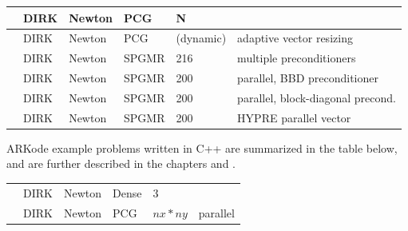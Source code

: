 \documentclass[letterpaper,10pt,english]{sphinxmanual}
\begin{document}
\begin{savenotes}
\begin{tabulary}{\linewidth}[t]{|T|T|T|T|T|T|}
\\
\hline
{\hyperref[\detokenize{c_serial:ark-heat1d}]{}}
&
DIRK
&
Newton
&
PCG
&
N
&\\
\hline
{\hyperref[\detokenize{c_serial:ark-heat1d-adapt}]{}}
&
DIRK
&
Newton
&
PCG
&
(dynamic)
&
adaptive vector resizing
\\
\hline
{\hyperref[\detokenize{c_serial:ark-krylovdemo-prec}]{}}
&
DIRK
&
Newton
&
SPGMR
&
216
&
multiple preconditioners
\\
\hline
{\hyperref[\detokenize{c_parallel:ark-diurnal-kry-bbd-p}]{}}
&
DIRK
&
Newton
&
SPGMR
&
200
&
parallel, BBD preconditioner
\\
\hline
{\hyperref[\detokenize{c_parallel:ark-diurnal-kry-p}]{}}
&
DIRK
&
Newton
&
SPGMR
&
200
&
parallel, block-diagonal precond.
\\
\hline
{\hyperref[\detokenize{c_parhyp:ark-diurnal-kry-ph}]{}}
&
DIRK
&
Newton
&
SPGMR
&
200
&
HYPRE parallel vector
\\
\hline
\end{tabulary}
\par
\sphinxattableend\end{savenotes}

ARKode example problems written in C++ are summarized in the table
below, and are further described in the chapters {\hyperref[\detokenize{cpp_serial:serial-cpp}]{}} and
{\hyperref[\detokenize{cpp_parallel:parallel-cpp}]{}}.


\begin{savenotes}\sphinxattablestart
\centering
\begin{tabulary}{\linewidth}[t]{|T|T|T|T|T|T|}
\hline
{}\relax &\relax &\relax &\relax &\relax &\relax \\
\hline
{\hyperref[\detokenize{cpp_serial:ark-analytic-sys}]{}}
&
DIRK
&
Newton
&
Dense
&
3
&\\
\hline
{\hyperref[\detokenize{cpp_parallel:ark-heat2d}]{}}
&
DIRK
&
Newton
&
PCG
&
\(nx*ny\)
&
parallel
\\
\hline
\end{tabulary}
\par
\sphinxattableend\end{savenotes}
\end{document}
